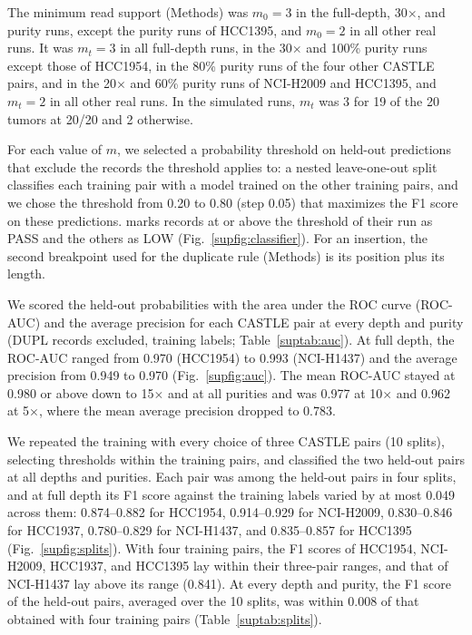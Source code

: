 The minimum read support (Methods) was $m_0=3$ in the full-depth, 30$\times$, and purity runs, except the purity runs of HCC1395, and $m_0=2$ in all other real runs.
It was $m_t=3$ in all full-depth runs, in the 30$\times$ and 100\% purity runs except those of HCC1954, in the 80\% purity runs of the four other CASTLE pairs, and in the 20$\times$ and 60\% purity runs of NCI-H2009 and HCC1395, and $m_t=2$ in all other real runs.
In the simulated runs, $m_t$ was 3 for 19 of the 20 tumors at 20/20 and 2 otherwise.

For each value of $m$, we selected a probability threshold on held-out predictions that exclude the records the threshold applies to: a nested leave-one-out split classifies each training pair with a model trained on the other training pairs, and we chose the threshold from 0.20 to 0.80 (step 0.05) that maximizes the F1 score on these predictions.
\tool{} marks records at or above the threshold of their run as PASS and the others as LOW (Fig.~\ref{supfig:classifier}).
For an insertion, the second breakpoint used for the duplicate rule (Methods) is its position plus its length.


We scored the held-out probabilities with the area under the ROC curve (ROC-AUC) and the average precision for each CASTLE pair at every depth and purity (DUPL records excluded, training labels; Table~\ref{suptab:auc}).
At full depth, the ROC-AUC ranged from 0.970 (HCC1954) to 0.993 (NCI-H1437) and the average precision from 0.949 to 0.970 (Fig.~\ref{supfig:auc}).
The mean ROC-AUC stayed at 0.980 or above down to 15$\times$ and at all purities and was 0.977 at 10$\times$ and 0.962 at 5$\times$, where the mean average precision dropped to 0.783.

We repeated the training with every choice of three CASTLE pairs (10 splits), selecting thresholds within the training pairs, and classified the two held-out pairs at all depths and purities.
Each pair was among the held-out pairs in four splits, and at full depth its F1 score against the training labels varied by at most 0.049 across them: 0.874--0.882 for HCC1954, 0.914--0.929 for NCI-H2009, 0.830--0.846 for HCC1937, 0.780--0.829 for NCI-H1437, and 0.835--0.857 for HCC1395 (Fig.~\ref{supfig:splits}).
With four training pairs, the F1 scores of HCC1954, NCI-H2009, HCC1937, and HCC1395 lay within their three-pair ranges, and that of NCI-H1437 lay above its range (0.841).
At every depth and purity, the F1 score of the held-out pairs, averaged over the 10 splits, was within 0.008 of that obtained with four training pairs (Table~\ref{suptab:splits}).

